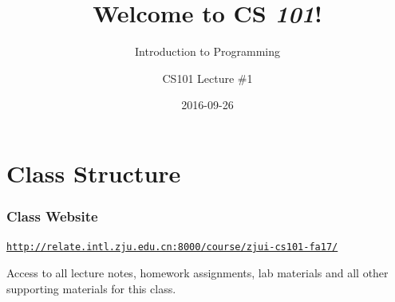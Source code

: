 \documentclass[11pt]{beamer}
\title{Welcome to CS \emph{101}!}
\subtitle{Introduction to Programming}
\author{CS101 Lecture \#1}
\date{2016-09-26}
\begin{document}

\newcommand{\Enlarge}{\large}
\newcommand{\CSBase}{blue}
\newcommand{\CSGradBot}{orange}
\newcommand{\CSAltDark}{black}
\newcommand{\CSPureBase}{blue}

\newcommand{\myitem}{\item}
\newcommand{\mysubitem}{\item}


\frame{\titlepage}

\setcounter{framenumber}{0}

\section{Class Structure}

\begin{frame}[plain,c]
  \frametitle{Class Website}
  \Enlarge 

  \begin{center}
    \textcolor{\CSBase}{\small \texttt{\url{http://relate.intl.zju.edu.cn:8000/course/zjui-cs101-fa17/}}}
    
    Access to all lecture notes, homework assignments, lab materials and all other supporting materials for this class.
  \end{center}
\end{frame}
\end{document}

